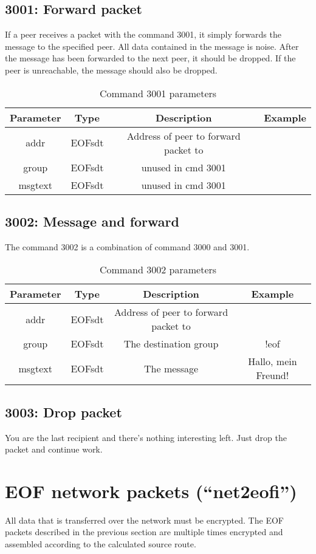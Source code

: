 \documentclass[12pt,a4paper]{book}
\begin{document}
\subsection{3001: Forward packet}
If a peer receives a packet with the command 3001, it simply forwards
the message to the specified peer. All data contained in the message
is noise. After the message has been forwarded to the next peer, it
should be dropped. If the peer is unreachable, the message should also
be dropped.
%
\begin{longtable}{|c|c|c|c|}
\caption{Command 3001 parameters}\\
\hline
\textbf{Parameter} & \textbf{Type} & \textbf{Description} & \textbf{Example}\\
\hline
addr & EOFsdt & Address of peer to forward packet to&\\
\hline
group & EOFsdt & unused in cmd 3001\\
\hline
msgtext & EOFsdt & unused in cmd 3001\\
\hline
\end{longtable}
\subsection{3002: Message and forward}
The command 3002 is a combination of command 3000 and 3001.
%
\begin{longtable}{|c|c|c|c|}
\caption{Command 3002 parameters}\\
\hline
\textbf{Parameter} & \textbf{Type} & \textbf{Description} & \textbf{Example}\\
\hline
addr & EOFsdt & Address of peer to forward packet to&\\
\hline
group & EOFsdt & The destination group & !eof\\
\hline
msgtext & EOFsdt & The message & Hallo, mein Freund!\\
\hline
\end{longtable}
\subsection{3003: Drop packet}
You are the last recipient and there's nothing interesting left.
Just drop the packet and continue work.
\section{EOF network packets ("`net2eofi"')}
All data that is transferred over the network must be encrypted.
The EOF packets described in the previous section are multiple times
encrypted and assembled according to the calculated source route.
\end{document}

